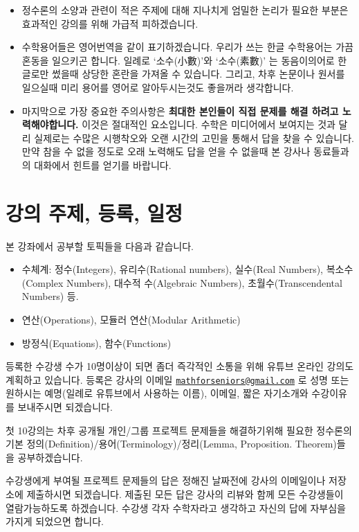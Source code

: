 \documentclass[a4paper, 11pt]{report}
\renewcommand{\<}{\langle}
\renewcommand{\>}{\rangle}
\begin{document}
\begin{itemize}
  \item 정수론의 소양과 관련이 적은 주제에 대해 지나치게 엄밀한 논리가 
  필요한 부분은 효과적인 강의를 위해 가급적 피하겠습니다.
  \item 수학용어들은 영어번역을 같이 표기하겠습니다. 우리가 쓰는 한글 
  수학용어는 가끔 혼동을 일으키곤 합니다. 일례로 ‘소수(小數)’와 ‘소수(素數)’
  는 동음이의어로 한글로만 썼을때 상당한 혼란을 가져올 수 있습니다. 그리고, 
  차후 논문이나 원서를 일으실때 미리 용어를 영어로 알아두시는것도 좋을꺼라 
  생각합니다.
  \item 마지막으로 가장 중요한 주의사항은 \textbf{최대한 본인들이 직접 문제를 해결
  하려고 노력해야합니다.} 이것은 절대적인 요소입니다. 수학은 미디어에서 보여지는 것과 
  달리 실제로는 수많은 시행착오와 오랜 시간의 고민을 통해서 답을 찾을 수 있습니다. 
  만약 참을 수 없을 정도로 오래 노력해도 답을 얻을 수 없을때 본 강사나 동료들과의 
  대화에서 힌트를 얻기를 바랍니다.
\end{itemize}

\section{강의 주제, 등록, 일정}

본 강좌에서 공부할 토픽들을 다음과 같습니다.

\begin{itemize}
  \item 수체계: 정수(Integers), 유리수(Rational numbers), 실수(Real Numbers), 
  복소수(Complex Numbers), 대수적 수(Algebraic Numbers), 
  초월수(Transcendental Numbers) 등.
  \item 연산(Operations), 모듈러 연산(Modular Arithmetic)
  \item 방정식(Equations), 함수(Functions)
\end{itemize}

등록한 수강생 수가 10명이상이 되면 좀더 즉각적인 소통을 위해 유튜브 온라인 강의도 계획하고 
있습니다. 등록은 강사의 이메일 \href{mailto:mathforseniors@gmail.com}{\texttt{mathforseniors@gmail.com}}
로 성명 또는 원하시는 예명(일례로 유튜브에서 사용하는 이름), 이메일, 짧은 자기소개와 
수강이유를 보내주시면 되겠습니다. 

첫 10강의는 차후 공개될 개인/그룹 프로젝트 문제들을 해결하기위해 필요한 정수론의 기본 
정의(Definition)/용어(Terminology)/정리(Lemma, Proposition. Theorem)들을 
공부하겠습니다.

수강생에게 부여될 프로젝트 문제들의 답은 정해진 날짜전에 강사의 이메일이나 저장소에
제출하시면 되겠습니다. 제출된 모든 답은 강사의 리뷰와 함께 모든 수강생들이 열람가능하도록 
하겠습니다. 수강생 각자 수학자라고 생각하고 자신의 답에 자부심을 가지게 되었으면 
합니다. 
\end{document}
